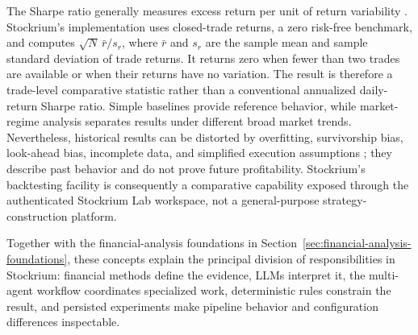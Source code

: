 The Sharpe ratio generally measures excess return per unit of return variability \cite{sharpe1994ratio}. Stockrium's implementation uses closed-trade returns, a zero risk-free benchmark, and computes $\sqrt{N}\,\bar{r}/s_r$, where $\bar{r}$ and $s_r$ are the sample mean and sample standard deviation of trade returns. It returns zero when fewer than two trades are available or when their returns have no variation. The result is therefore a trade-level comparative statistic rather than a conventional annualized daily-return Sharpe ratio. Simple baselines provide reference behavior, while market-regime analysis separates results under different broad market trends. Nevertheless, historical results can be distorted by overfitting, survivorship bias, look-ahead bias, incomplete data, and simplified execution assumptions \cite{bailey2017pbo}; they describe past behavior and do not prove future profitability. Stockrium's backtesting facility is consequently a comparative capability exposed through the authenticated Stockrium Lab workspace, not a general-purpose strategy-construction platform.

Together with the financial-analysis foundations in Section~\ref{sec:financial-analysis-foundations}, these concepts explain the principal division of responsibilities in Stockrium: financial methods define the evidence, LLMs interpret it, the multi-agent workflow coordinates specialized work, deterministic rules constrain the result, and persisted experiments make pipeline behavior and configuration differences inspectable.
